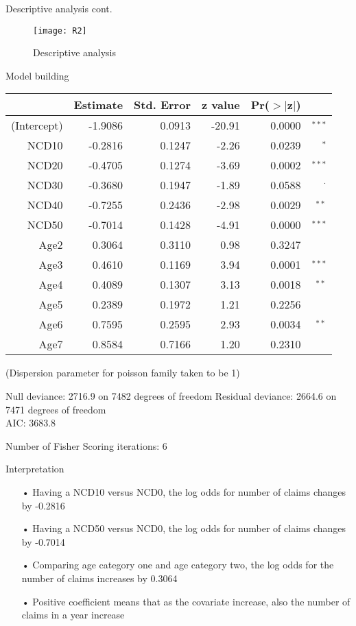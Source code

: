 \documentclass[11pt]{beamer}
\begin{document}
\begin{frame}{Descriptive analysis cont.}
\begin{figure}[H]
\texttt{[image: R2]}
\centering
\caption{Descriptive analysis}
\end{figure}
\end{frame}
\begin{frame}{Model building}
\begin{table}[H]
\centering
\begin{tabular}{rrrrrr}
  \hline
 & Estimate & Std. Error & z value & Pr($>$$|$z$|$) \\ 
  \hline
(Intercept) & -1.9086 & 0.0913 & -20.91 & 0.0000&$^{***}$ \\ 
  NCD10 & -0.2816 & 0.1247 & -2.26 & 0.0239&$^{*}$ \\ 
  NCD20 & -0.4705 & 0.1274 & -3.69 & 0.0002&$^{***}$ \\ 
  NCD30 & -0.3680 & 0.1947 & -1.89 & 0.0588 &$^{.}$\\ 
  NCD40 & -0.7255 & 0.2436 & -2.98 & 0.0029&$^{**}$ \\ 
  NCD50 & -0.7014 & 0.1428 & -4.91 & 0.0000 &$^{***}$\\ 
  Age2 & 0.3064 & 0.3110 & 0.98 & 0.3247 &$^{}$\\ 
  Age3 & 0.4610 & 0.1169 & 3.94 & 0.0001&$^{***}$ \\ 
  Age4 & 0.4089 & 0.1307 & 3.13 & 0.0018&$^{**}$ \\ 
  Age5 & 0.2389 & 0.1972 & 1.21 & 0.2256 \\ 
  Age6 & 0.7595 & 0.2595 & 2.93 & 0.0034&$^{**}$ \\ 
  Age7 & 0.8584 & 0.7166 & 1.20 & 0.2310 \\ 
   \hline
\end{tabular}
\end{table}
\end{frame}
\begin{frame}
(Dispersion parameter for poisson family taken to be 1)

    Null deviance: 2716.9  on 7482  degrees of freedom
Residual deviance: 2664.6  on 7471  degrees of freedom \\
AIC: 3683.8

Number of Fisher Scoring iterations: 6
\end{frame}
\begin{frame}{Interpretation}
\begin{itemize}
\item[•]Having a NCD10 versus NCD0, the log odds for number of claims changes by -0.2816
\item[•]Having a NCD50 versus NCD0, the log odds for number of claims changes by -0.7014
\item[•]Comparing age category one and age category two, the log odds for the  number of claims increases by 0.3064
\item[•]Positive coefficient means that as the covariate increase, also the number of claims in a year increase
\end{itemize}

\end{frame}
\end{document}
